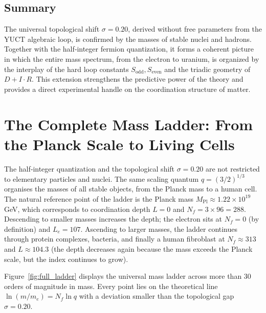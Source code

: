 \documentclass[12pt,a4paper]{article}
\begin{document}
\subsection{Summary}

The universal topological shift \(\sigma = 0.20\), derived without free parameters from the YUCT algebraic loop, is confirmed by the masses of stable nuclei and hadrons. Together with the half‑integer fermion quantization, it forms a coherent picture in which the entire mass spectrum, from the electron to uranium, is organized by the interplay of the hard loop constants \(S_{\mathrm{odd}}, S_{\mathrm{even}}\) and the triadic geometry of \(D+I\cdot R\). This extension strengthens the predictive power of the theory and provides a direct experimental handle on the coordination structure of matter.

\section{The Complete Mass Ladder: From the Planck Scale to Living Cells}
\label{sec:complete_ladder}

The half‑integer quantization and the topological shift \(\sigma = 0.20\) are not
restricted to elementary particles and nuclei.  The same scaling quantum
\(q = (3/2)^{1/3}\) organises the masses of all stable objects, from the Planck
mass to a human cell.  The natural reference point of the ladder is the Planck
mass \(M_{\mathrm{Pl}} \approx 1.22 \times 10^{19}\) GeV, which corresponds to
coordination depth \(L = 0\) and \(N_f = 3 \times 96 = 288\).  Descending to
smaller masses increases the depth; the electron sits at \(N_f = 0\) (by
definition) and \(L_e = 107\).  Ascending to larger masses, the ladder continues
through protein complexes, bacteria, and finally a human fibroblast at
\(N_f \approx 313\) and \(L \approx 104.3\) (the depth decreases again because
the mass exceeds the Planck scale, but the index continues to grow).

Figure~\ref{fig:full_ladder} displays the universal mass ladder across more than
30 orders of magnitude in mass.  Every point lies on the theoretical line
\(\ln(m/m_e) = N_f \ln q\) with a deviation smaller than the topological gap
\(\sigma = 0.20\).
\end{document}
